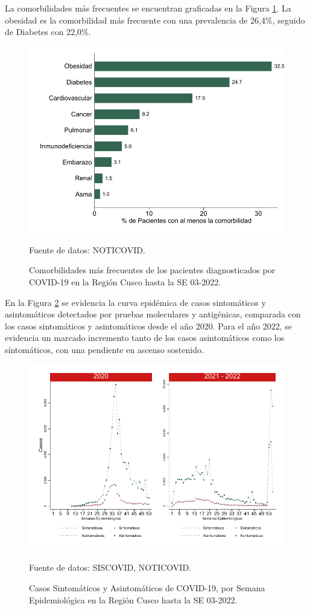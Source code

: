 \documentclass[12pt,a4paper,openany]{book}
\begin{document}
La comorbilidades más frecuentes se encuentran graficadas en la Figura \ref{fig:comorbilidades}. La obesidad es la comorbilidad más frecuente con una prevalencia de 26,4$\%$, seguido de Diabetes con 22,0$\%$. 
\begin{figure}[h]
	\caption{Comorbilidades más frecuentes de los pacientes diagnosticados por COVID-19 en la Región Cusco hasta la SE 03-2022. }\label{fig:comorbilidades}
	\begin{center}
		\includegraphics[width=0.65\linewidth]{../figuras/figura_comorbilidad.pdf}
	\end{center}
	{\footnotesize {Fuente de datos: NOTICOVID.}}
\end{figure}
\clearpage
 En la Figura \ref{fig:sintomaticos_asintomati} se evidencia la curva epidémica de casos sintomáticos y asintomáticos detectados por pruebas moleculares y antigénicas, comparada con los casos sintomáticos y asintomáticos desde el año 2020. Para el año 2022, se evidencia un marcado incremento tanto de los casos asintomáticos como los síntomáticos, con una pendiente en ascenso sostenido.  
 
\begin{figure}[h]
	\caption{Casos Sintomáticos y Asintomáticos de COVID-19, por Semana Epidemiológica en la Región Cusco hasta la SE 03-2022.  }\label{fig:sintomaticos_asintomati}
	
	\begin{center}
		\includegraphics[width=0.75\linewidth]{../figuras/sintomaticos_20_21_22.pdf}
	\end{center}
	{\footnotesize {Fuente de datos: SISCOVID, NOTICOVID.}}
\end{figure}
\clearpage
\end{document}
